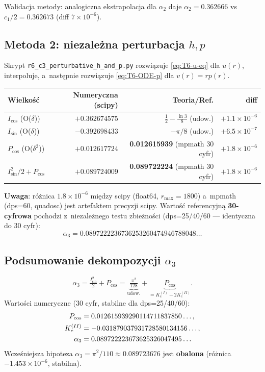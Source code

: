 Walidacja metody: analogiczna ekstrapolacja dla $\alpha_2$ daje
$\alpha_2 = 0.362666$ vs~$c_1/2 = 0.362673$ (diff $7 \times 10^{-6}$).

\subsection*{Metoda 2: niezale\.zna perturbacja $h, p$}

Skrypt \texttt{r6\_c3\_perturbative\_h\_and\_p.py} rozwi\k{a}zuje
\eqref{eq:T6-u-eq} dla $u(r)$, interpoluje, a~nast\k{e}pnie rozwi\k{a}zuje
\eqref{eq:T6-ODE-p} dla $v(r) = r p(r)$.

\begin{center}
\begin{tabular}{lrrr}
\hline
Wielko\'s\'c & Numeryczna (scipy) & Teoria/Ref. & diff \\
\hline
$I_{\cos}$ (O($\delta$))  & $+0.362674575$ & $\frac{1}{2} - \frac{\ln 3}{8}$ (udow.) & $+1.1 \times 10^{-6}$ \\
$I_{\sin}$ (O($\delta$))  & $-0.392698433$ & $-\pi/8$ (udow.)                        & $+6.5 \times 10^{-7}$ \\
$P_{\cos}$ (O($\delta^3$)) & $+0.012617724$ & \textbf{0.012615939} (mpmath 30 cyfr)   & $+1.8 \times 10^{-6}$ \\
$I_{\sin}^2/2 + P_{\cos}$ & $+0.089724009$ & \textbf{0.089722224} (mpmath 30 cyfr)   & $+1.8 \times 10^{-6}$ \\
\hline
\end{tabular}

\medskip
\textbf{Uwaga}: r\'o\.znica $1.8 \times 10^{-6}$ mi\k{e}dzy scipy (float64,
$r_{\max}=1800$) a~mpmath (dps=60, quadosc) jest artefaktem precyzji scipy.
Warto\'s\'c referencyjn\k{a} \textbf{30-cyfrowa} pochodzi z~niezale\.znego testu
zbie\.zno\'sci (dps=25/40/60 --- identyczna do 30 cyfr):
\begin{equation}
  \alpha_3 = 0.0897222236736253260474946788048\ldots
\end{equation}
\end{center}

\subsection*{Podsumowanie dekompozycji $\alpha_3$}

\begin{equation}
  \alpha_3 = \tfrac{I_{\sin}^2}{2} + P_{\cos} = \underbrace{\tfrac{\pi^2}{128}}_{\text{udow.}}
   + \underbrace{P_{\cos}}_{= K_c^{(I)} - 2K_c^{(II)}}.
\end{equation}
Warto\'sci numeryczne (30 cyfr, stabilne dla dps=25/40/60):
\begin{align}
  P_{\cos} &= 0.012615939290114711837850\ldots, \notag \\
  K_c^{(II)} &= -0.031879037931728580134156\ldots, \notag \\
  \alpha_3 &= 0.089722223673625326047495\ldots \notag
\end{align}
Wcze\'sniejsza hipoteza $\alpha_3 = \pi^2/110 \approx 0.089723676$ jest \textbf{obalona}
(r\'o\.znica $-1.453 \times 10^{-6}$, stabilna).

